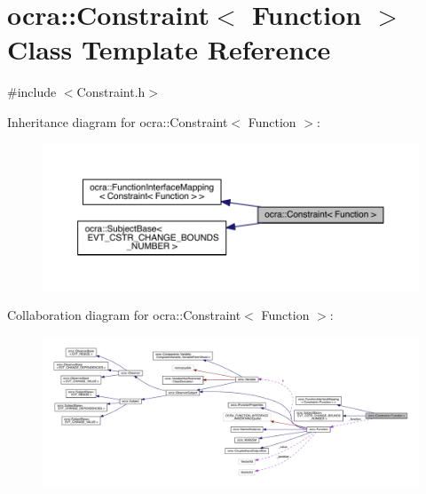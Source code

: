 \hypertarget{classocra_1_1Constraint_3_01Function_01_4}{}\section{ocra\+:\+:Constraint$<$ Function $>$ Class Template Reference}
\label{classocra_1_1Constraint_3_01Function_01_4}


{\ttfamily \#include $<$Constraint.\+h$>$}



Inheritance diagram for ocra\+:\+:Constraint$<$ Function $>$\+:\nopagebreak
\begin{figure}[H]
\begin{center}
\leavevmode
\includegraphics[width=350pt]{d8/d55/classocra_1_1Constraint_3_01Function_01_4__inherit__graph}
\end{center}
\end{figure}


Collaboration diagram for ocra\+:\+:Constraint$<$ Function $>$\+:\nopagebreak
\begin{figure}[H]
\begin{center}
\leavevmode
\includegraphics[width=350pt]{d6/dca/classocra_1_1Constraint_3_01Function_01_4__coll__graph}
\end{center}
\end{figure}
